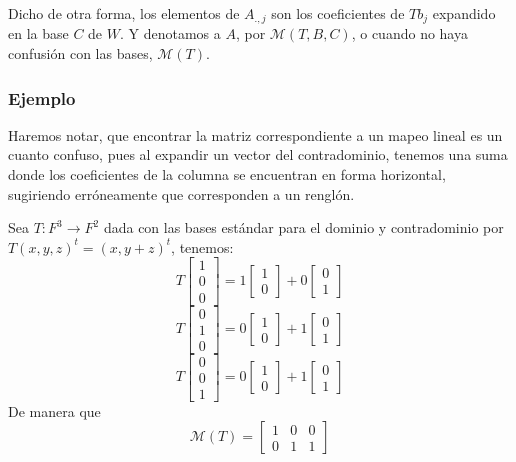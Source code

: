 \documentclass{article}
\begin{document}
Dicho de otra forma, los elementos de $A_{.,j}$ son los coeficientes
de $Tb_j$ expandido en la base $C$ de $W$. Y denotamos a $A$, por
$\mathcal{M}(T,B,C)$, o cuando no haya confusión con las bases,
$\mathcal{M}(T)$.

\subsubsection{Ejemplo}
Haremos notar, que encontrar la matriz correspondiente a un mapeo lineal
es un cuanto confuso, pues al expandir un vector del contradominio,
tenemos una suma donde los coeficientes de la columna se encuentran
en forma horizontal, sugiriendo erróneamente que corresponden a un
renglón.

Sea $T:F^3\rightarrow F^2$ dada con las bases estándar para el dominio y
contradominio por $T(x,y,z)^t = (x,y + z)^t$, tenemos:
{
$$T\begin{bmatrix}
    1\\
    0\\
    0    
\end{bmatrix}
 = 
 1\begin{bmatrix}
    1\\
    0
 \end{bmatrix}
 +0\begin{bmatrix}
    0\\
    1
 \end{bmatrix}
 $$
 $$T\begin{bmatrix}
    0\\
    1\\
    0
 \end{bmatrix}
 =
 0\begin{bmatrix}
    1\\
    0
 \end{bmatrix}
 +1\begin{bmatrix}
    0\\
    1
 \end{bmatrix}
 $$
 $$
 T\begin{bmatrix}
    0\\
    0\\
    1
 \end{bmatrix}
 =
 0\begin{bmatrix}
    1\\
    0
 \end{bmatrix}
 +
 1\begin{bmatrix}
    0\\
    1
 \end{bmatrix}
 $$
}
De manera que
$$\mathcal{M}(T) = \begin{bmatrix}
    1 & 0 & 0\\
    0 & 1 & 1
\end{bmatrix}$$
\end{document}
